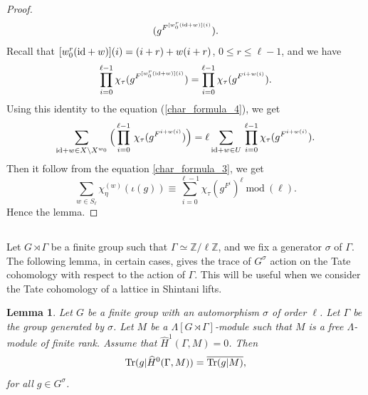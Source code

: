 \documentclass[10pt, reqno]{amsart}
\theoremstyle{plain}
\numberwithin{equation}{section} \newcommand{\di}{\operatorname{dim}}
\newtheorem{lemma}[theorem]{Lemma}
\begin{document}
\begin{proof}
\begin{equation}
(g^{F^{[w_0^r({\rm id}+w)](i)}}).
\end{equation}
Recall that $[w_0^r({\rm id}+w)](i) = (i+r) + w(i+r)$,
$0\leq r \leq \ell-1$, and we have
$$ \prod_{i=0}^{\ell-1} \chi_\tau
(g^{F^{[w_0^r({\rm id}+w)](i)}}) = 
\prod_{i=0}^{\ell-1} \chi_\tau
(g^{F^{i+w(i)}}). $$
Using this identity to the equation (\ref{char_formula_4}), we get
$$ \sum_{{\rm id}+w\in X\setminus X^{w_0}}\Big(\prod_{i=0}^{\ell-1}\,
\chi_\tau(g^{F^{i+w(i)}})\Big) =
\ell\sum_{{\rm id}+w\in U}
\,\prod_{i=0}^{\ell-1}\chi_\tau
(g^{F^{i+w(i)}}). $$ Then it
follow from the equation 
\eqref{char_formula_3}, we get
$$ \sum_{w\in S_\ell}
\chi^{(w)}_\eta(\iota(g)) \equiv
\sum_{i=0}^{\ell-1}
\chi_\tau(g^{F^i})^\ell\ \text{mod}\  (\ell).$$
Hence the lemma.
\end{proof}
\subsection{}
Let $G\rtimes \Gamma$ be a finite group such that
$\Gamma\simeq \mathbb{Z}/\ell\mathbb{Z}$, and we fix a generator
$\sigma$ of $\Gamma$.  The following lemma, in certain cases, gives
the trace of $G^\sigma$ action on the Tate cohomology with respect to
the action of $\Gamma$.  This will be useful when we consider the Tate
cohomology of a lattice in Shintani lifts.
\begin{lemma}\label{char_iden_1}
  Let $G$ be a finite group with an automorphism $\sigma$ of order
  $\ell$. Let $\Gamma$ be the group generated by $\sigma$. Let $M$ be
  a $\Lambda[G\rtimes \Gamma]$-module such that $M$ is a free
  $\Lambda$-module of finite rank. Assume that
  $\widehat{H}^1(\Gamma, M) =0$. Then
$$ {\rm Tr}(g|\widehat{H}^0(\Gamma, M))=\overline{{\rm Tr}(g|M)}, $$ 
for all $g\in G^\sigma$.
\end{lemma}
\end{document}
